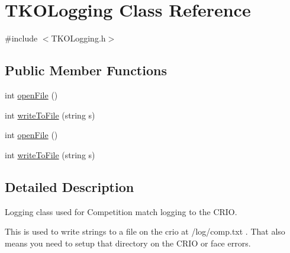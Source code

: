 \hypertarget{class_t_k_o_logging}{\section{T\-K\-O\-Logging Class Reference}
\label{class_t_k_o_logging}
}


{\ttfamily \#include $<$T\-K\-O\-Logging.\-h$>$}

\subsection*{Public Member Functions}
\begin{DoxyCompactItemize}
\item 
int \hyperlink{class_t_k_o_logging_a8061ae2e7d18973cd466789a98fb5eaf}{open\-File} ()
\item 
int \hyperlink{class_t_k_o_logging_a6c78e53cab1242c12b160f1fb1542b02}{write\-To\-File} (string s)
\item 
int \hyperlink{class_t_k_o_logging_a8061ae2e7d18973cd466789a98fb5eaf}{open\-File} ()
\item 
int \hyperlink{class_t_k_o_logging_a6c78e53cab1242c12b160f1fb1542b02}{write\-To\-File} (string s)
\end{DoxyCompactItemize}


\subsection{Detailed Description}
Logging class used for Competition match logging to the C\-R\-I\-O.

This is used to write strings to a file on the crio at /log/comp.txt . That also means you need to setup that directory on the C\-R\-I\-O or face errors. 

